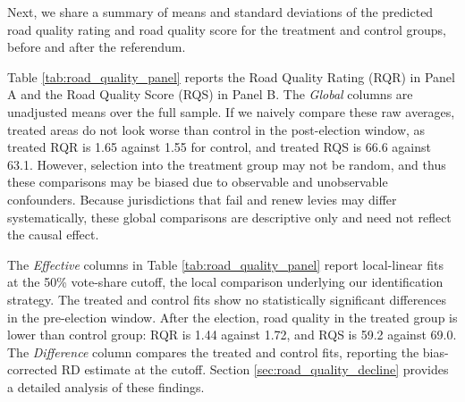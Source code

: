 Next, we share a summary of means and standard deviations of the predicted road quality rating and road quality score for the treatment and control groups, before and after the referendum. 



Table \ref{tab:road_quality_panel} reports the Road Quality Rating (RQR) in Panel A and the Road Quality Score (RQS) in Panel B. The \textit{Global} columns are unadjusted means over the full sample. If we naively compare these raw averages, treated areas do not look worse than control in the post-election window, as treated RQR is 1.65 against 1.55 for control, and treated RQS is 66.6 against 63.1. However, selection into the treatment group may not be random, and thus these comparisons may be biased due to observable and unobservable confounders.
Because jurisdictions that fail and renew levies may differ systematically, these global comparisons are descriptive only and need not reflect the causal effect.

The \textit{Effective} columns in Table \ref{tab:road_quality_panel} report local-linear fits at the 50\% vote-share cutoff, the local comparison underlying our identification strategy. The treated and control fits show no statistically significant differences in the pre-election window. After the election, road quality in the treated group is lower than control group: RQR is 1.44 against 1.72, and RQS is 59.2 against 69.0. The \textit{Difference} column compares the treated and control fits, reporting the bias-corrected RD estimate at the cutoff.
Section \ref{sec:road_quality_decline} provides a detailed analysis of these findings.




